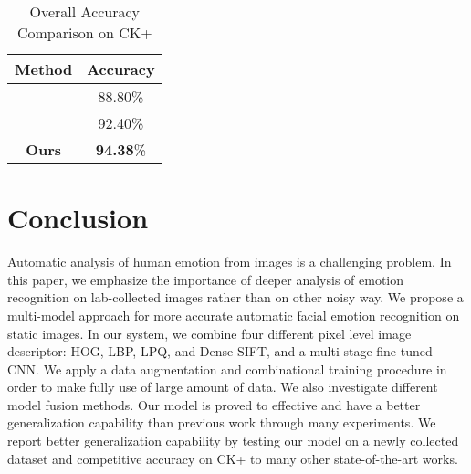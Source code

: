 \documentclass[conference]{IEEEtran}
\begin{document}
\begin{table}[!t]
\caption{Overall Accuracy Comparison on CK+}
\label{tb:CK}
\centering
\begin{tabular}{c|c}
\hline
Method & Accuracy\\
\hline
\cite{Wang2013Capturing} & 88.80\%\\
\hline
\cite{Liu2014Deeply} & 92.40\%\\
\hline
\textbf{Ours} & \textbf{94.38}\%\\
\hline
\end{tabular}
\end{table}

\section{Conclusion}
\label{sec:con}
Automatic analysis of human emotion from images is a challenging problem. In this paper, we emphasize the importance of deeper analysis of emotion recognition on lab-collected images rather than on other noisy way. We propose a multi-model approach for more accurate automatic facial emotion recognition on static images. In our system, we combine four different pixel level image descriptor: HOG, LBP, LPQ, and Dense-SIFT, and a multi-stage fine-tuned CNN. We apply a data augmentation and combinational training procedure in order to make fully use of large amount of data. We also investigate different model fusion methods. Our model is proved to effective and have a better generalization capability than previous work through many experiments. We report better generalization capability by testing our model on a newly collected dataset and competitive accuracy on CK+ to many other state-of-the-art works.


\end{document}
